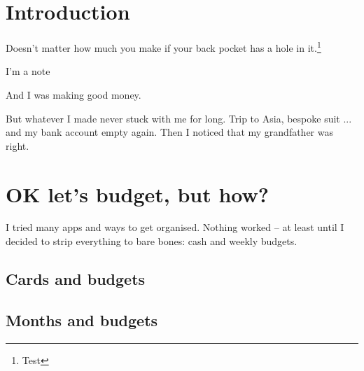 \section*{Introduction}

\begin{figure}
  \centering
\end{figure}

Doesn't matter how much you make if your back pocket has a hole in it.\footnote{Test}

\begin{note}
I'm a note
\end{note}



And I was making good money.

But whatever I made never stuck with me for long. Trip to Asia, bespoke suit ... and my bank account empty again. Then I noticed that my grandfather was right.
\pagebreak

\section{OK let's budget, but how?}

I tried many apps and ways to get organised. Nothing worked – at least until I decided to strip everything to bare bones: cash and weekly budgets.

\subsection{Cards and budgets}
\subsection{Months and budgets}

